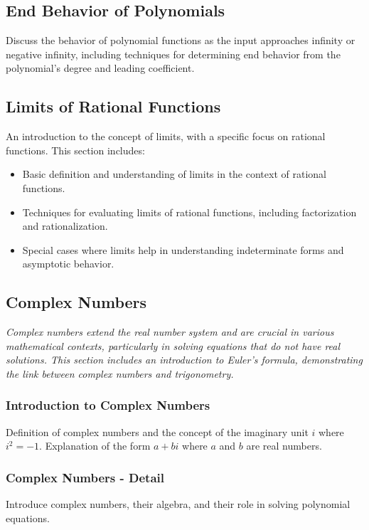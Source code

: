 \documentclass[a4paper,12pt]{book}
\begin{document}
\subsection{End Behavior of Polynomials}
\label{subsec:end_behavior_polynomials}
Discuss the behavior of polynomial functions as the input approaches infinity or negative infinity, including techniques for determining end behavior from the polynomial's degree and leading coefficient.

\subsection{Limits of Rational Functions}
\label{subsec:limits_rational_functions}
An introduction to the concept of limits, with a specific focus on rational functions. This section includes:

\begin{itemize}
    \item Basic definition and understanding of limits in the context of rational functions.
    \item Techniques for evaluating limits of rational functions, including factorization and rationalization.
    \item Special cases where limits help in understanding indeterminate forms and asymptotic behavior.
\end{itemize}

\subsection{Complex Numbers}
\label{subsec:complex_numbers}
\textit{Complex numbers extend the real number system and are crucial in various mathematical contexts, particularly in solving equations that do not have real solutions. This section includes an introduction to Euler's formula, demonstrating the link between complex numbers and trigonometry.}


\subsubsection{Introduction to Complex Numbers}
Definition of complex numbers and the concept of the imaginary unit \( i \) where \( i^2 = -1 \). Explanation of the form \( a + bi \) where \( a \) and \( b \) are real numbers.


\subsubsection{Complex Numbers - Detail}
\label{subsec:complex_numbers_detail}
Introduce complex numbers, their algebra, and their role in solving polynomial equations.
\end{document}
